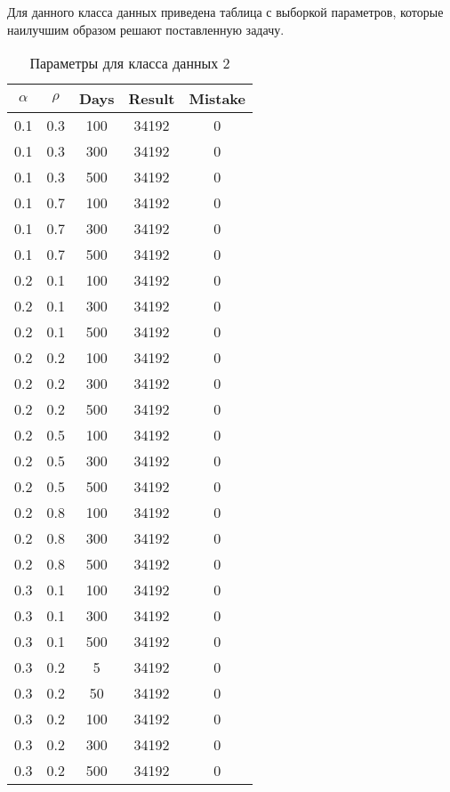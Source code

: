 Для данного класса данных приведена таблица с выборкой параметров, которые наилучшим образом решают поставленную задачу.

\begin{center}
	\captionsetup{justification=raggedright,singlelinecheck=off}
	\begin{longtable}[c]{|c|c|c|c|c|}
		\caption{Параметры для класса данных 2\label{tbl:table_kd2}}\\ \hline
		$\alpha$ & $\rho$ & Days & Result & Mistake \\ \hline
		0.1 &  0.3 &  100 & 34192 &     0 \\
		0.1 &  0.3 &  300 & 34192 &     0 \\
		0.1 &  0.3 &  500 & 34192 &     0 \\ \hline
		0.1 &  0.7 &  100 & 34192 &     0 \\
		0.1 &  0.7 &  300 & 34192 &     0 \\
		0.1 &  0.7 &  500 & 34192 &     0 \\ \hline
		0.2 &  0.1 &  100 & 34192 &     0 \\
		0.2 &  0.1 &  300 & 34192 &     0 \\
		0.2 &  0.1 &  500 & 34192 &     0 \\ \hline
		0.2 &  0.2 &  100 & 34192 &     0 \\
		0.2 &  0.2 &  300 & 34192 &     0 \\
		0.2 &  0.2 &  500 & 34192 &     0 \\ \hline
		0.2 &  0.5 &  100 & 34192 &     0 \\
		0.2 &  0.5 &  300 & 34192 &     0 \\
		0.2 &  0.5 &  500 & 34192 &     0 \\ \hline
		0.2 &  0.8 &  100 & 34192 &     0 \\
		0.2 &  0.8 &  300 & 34192 &     0 \\
		0.2 &  0.8 &  500 & 34192 &     0 \\ \hline
		0.3 &  0.1 &  100 & 34192 &     0 \\
		0.3 &  0.1 &  300 & 34192 &     0 \\
		0.3 &  0.1 &  500 & 34192 &     0 \\ \hline
		0.3 &  0.2 &    5 & 34192 &     0 \\
		0.3 &  0.2 &   50 & 34192 &     0 \\
		0.3 &  0.2 &  100 & 34192 &     0 \\
		0.3 &  0.2 &  300 & 34192 &     0 \\
		0.3 &  0.2 &  500 & 34192 &     0 \\ \hline

\end{longtable}
\end{center}
